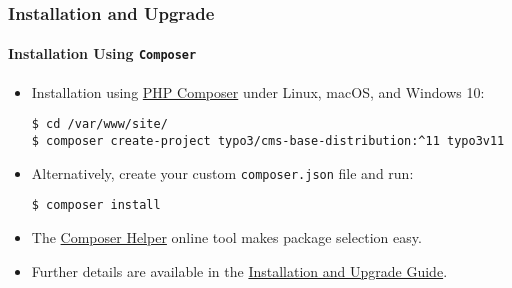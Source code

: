 %

\begin{frame}[fragile]
	\frametitle{Installation and Upgrade}
	\framesubtitle{Installation Using \texttt{Composer}}


	\begin{itemize}
		\item Installation using \href{https://getcomposer.org}{PHP Composer} under Linux, macOS, and Windows 10:
\begin{lstlisting}
$ cd /var/www/site/
$ composer create-project typo3/cms-base-distribution:^11 typo3v11
\end{lstlisting}

		\item Alternatively, create your custom \texttt{composer.json} file and run:
\begin{lstlisting}
$ composer install
\end{lstlisting}

		\item The \href{https://get.typo3.org/misc/composer/helper}{Composer Helper}
			online tool makes package selection easy.

		\item Further details are available in the
			\href{https://docs.typo3.org/m/typo3/guide-installation/master/en-us/}{Installation and Upgrade Guide}.

	\end{itemize}
\end{frame}


